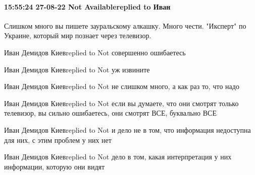  
 
 
 
 

\paragraph{15:55:24 27-08-22 Not Availablereplied to Иван}

Слишком много вы пишете зауральскому алкашку. Много чести. "Иксперт" по
Украине, который мир познает через телевизор.


Иван Демидов Киевreplied to Not
совершенно ошибаетесь

Иван Демидов Киевreplied to Not
уж извините

Иван Демидов Киевreplied to Not
не слишком много, а как раз то, что надо

Иван Демидов Киевreplied to Not
если вы думаете, что они смотрят только телевизор, вы сильно ошибаетесь, они смотрят ВСЕ, буквально ВСЕ

Иван Демидов Киевreplied to Not
и дело не в том, что информация недоступна для них, с этим проблем у них нет

Иван Демидов Киевreplied to Not
дело в том, какая интерпретация у них информации, которую они видят
